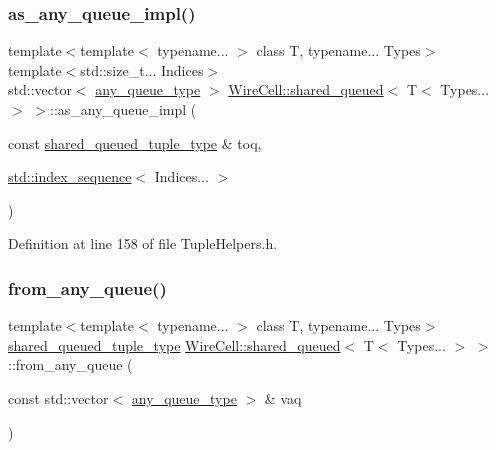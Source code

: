 \subsubsection{\texorpdfstring{as\+\_\+any\+\_\+queue\+\_\+impl()}{as\_any\_queue\_impl()}}
{\footnotesize\ttfamily template$<$template$<$ typename... $>$ class T, typename... Types$>$ \\
template$<$std\+::size\+\_\+t... Indices$>$ \\
std\+::vector$<$ \hyperlink{struct_wire_cell_1_1shared__queued_3_01_t_3_01_types_8_8_8_01_4_01_4_a8ff8e1f0ff23fd750a91eeb2d4952bb0}{any\+\_\+queue\+\_\+type} $>$ \hyperlink{struct_wire_cell_1_1shared__queued}{Wire\+Cell\+::shared\+\_\+queued}$<$ T$<$ Types... $>$ $>$\+::as\+\_\+any\+\_\+queue\+\_\+impl (\begin{DoxyParamCaption}\item[{const \hyperlink{struct_wire_cell_1_1shared__queued_3_01_t_3_01_types_8_8_8_01_4_01_4_ab8420ec9cbc02f0d73f0e7521a063cb0}{shared\+\_\+queued\+\_\+tuple\+\_\+type} \&}]{toq,  }\item[{\hyperlink{structstd_1_1index__sequence}{std\+::index\+\_\+sequence}$<$ Indices... $>$}]{ }\end{DoxyParamCaption})\hspace{0.3cm}{\ttfamily [inline]}}



Definition at line 158 of file Tuple\+Helpers.\+h.

\mbox{\label{struct_wire_cell_1_1shared__queued_3_01_t_3_01_types_8_8_8_01_4_01_4_aa9a1f473b6503cd70756adf590f008c3}} 
\subsubsection{\texorpdfstring{from\+\_\+any\+\_\+queue()}{from\_any\_queue()}}
{\footnotesize\ttfamily template$<$template$<$ typename... $>$ class T, typename... Types$>$ \\
\hyperlink{struct_wire_cell_1_1shared__queued_3_01_t_3_01_types_8_8_8_01_4_01_4_ab8420ec9cbc02f0d73f0e7521a063cb0}{shared\+\_\+queued\+\_\+tuple\+\_\+type} \hyperlink{struct_wire_cell_1_1shared__queued}{Wire\+Cell\+::shared\+\_\+queued}$<$ T$<$ Types... $>$ $>$\+::from\+\_\+any\+\_\+queue (\begin{DoxyParamCaption}\item[{const std\+::vector$<$ \hyperlink{struct_wire_cell_1_1shared__queued_3_01_t_3_01_types_8_8_8_01_4_01_4_a8ff8e1f0ff23fd750a91eeb2d4952bb0}{any\+\_\+queue\+\_\+type} $>$ \&}]{vaq }\end{DoxyParamCaption})\hspace{0.3cm}{\ttfamily [inline]}}

